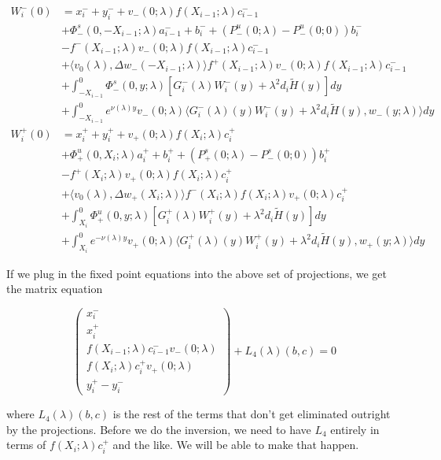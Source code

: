 \documentclass[12pt]{article}
\begin{document}
\begin{enumerate}
\begin{align*}
W_i^-(0) &= x_i^- + y_i^- + v_-(0; \lambda) f(X_{i-1}; \lambda) c_{i-1}^-  \\
&+\Phi^s_-(0, -X_{i-1}; \lambda)a_{i-1}^- + b_i^- + (P^u_-(0; \lambda) - P^u_-(0; 0))b_i^- \\
&- f^-(X_{i-1}; \lambda) v_-(0; \lambda) f(X_{i-1}; \lambda) c_{i-1}^- \\
&+ \langle v_0(\lambda), \Delta w_-(-X_{i-1}; \lambda) \rangle 
f^+(X_{i-1}; \lambda) v_-(0; \lambda) f(X_{i-1}; \lambda) c_{i-1}^- \\
&+ \int_{-X_{i-1}}^0 \Phi^s_-(0, y; \lambda) [ G_i^-(\lambda)W_i^-(y) + \lambda^2 d_i \tilde{H}(y) ] dy \\
&+ \int_{-X_{i-1}}^0
e^{\nu(\lambda)y} v_-(0; \lambda) \langle G_i^-(\lambda)(y)W_i^-(y) + \lambda^2 d_i \tilde{H}(y), w_-(y; \lambda) \rangle dy \\
W_i^+(0) &= x_i^+ + y_i^+ + v_+(0; \lambda) f(X_i; \lambda) c_i^+ \\
&+\Phi^u_+(0, X_i; \lambda)a_i^+ + b_i^+ + (P^s_+(0; \lambda) - P^s_-(0; 0))b_i^+ \\
&- f^+(X_i; \lambda) v_+(0; \lambda) f(X_i; \lambda) c_i^+ \\
&+ \langle v_0(\lambda), \Delta w_+(X_i; \lambda) \rangle 
f^-(X_i; \lambda)f(X_i; \lambda) v_+(0; \lambda) c_i^+ \\
&+ \int_{X_i}^0 \Phi^u_+(0, y; \lambda) [ G_i^+(\lambda)W_i^+(y) + \lambda^2 d_i \tilde{H}(y) ] dy \\
&+ \int_{X_i}^0 e^{-\nu(\lambda)y} v_+(0; \lambda) \langle G_i^+(\lambda)(y)W_i^+(y) + \lambda^2 d_i \tilde{H}(y), w_+(y; \lambda) \rangle dy
\end{align*}

If we plug in the fixed point equations into the above set of projections, we get the matrix equation

\[
\begin{pmatrix}x_i^- \\ x_i^+ \\ 
f(X_{i-1}; \lambda) c_{i-1}^- v_-(0; \lambda) \\
f(X_i; \lambda) c_i^+ v_+(0; \lambda) \\
y_i^+ - y_i^- \end{pmatrix} + L_4(\lambda)(b, c) = 0
\]


where $L_4(\lambda)(b, c)$ is the rest of the terms that don't get eliminated outright by the projections. Before we do the inversion, we need to have $L_4$ entirely in terms of $f(X_i; \lambda) c_i^+$ and the like. We will be able to make that happen. \\


\end{enumerate}
\end{document}
